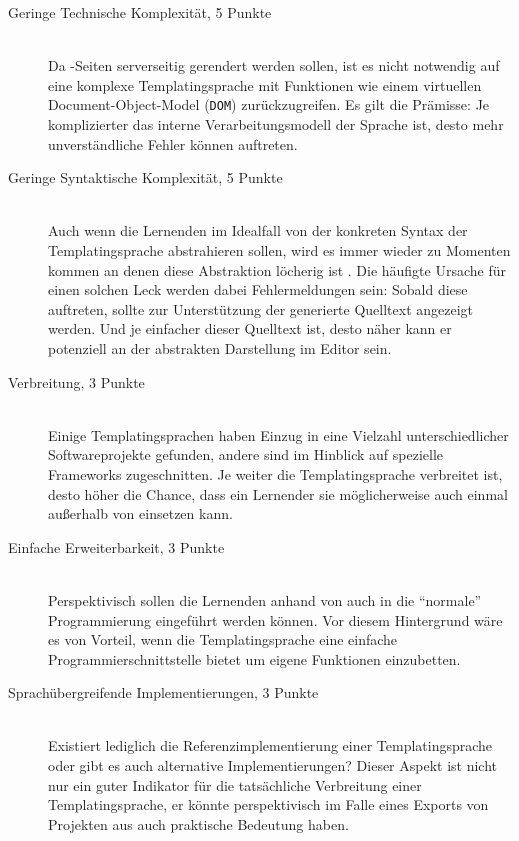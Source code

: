 \begin{description}
\item[Geringe Technische Komplexität, 5 Punkte] \hfill \\
  Da \idename-Seiten serverseitig gerendert werden sollen, ist es nicht notwendig auf eine komplexe Templatingsprache mit Funktionen wie einem virtuellen Document-Object-Model (\texttt{DOM}) zurückzugreifen. Es gilt die Prämisse: Je komplizierter das interne Verarbeitungsmodell der Sprache ist, desto mehr unverständliche Fehler können auftreten.
\item[Geringe Syntaktische Komplexität, 5 Punkte] \hfill \\
  Auch wenn die Lernenden im Idealfall von der konkreten Syntax der Templatingsprache abstrahieren sollen, wird es immer wieder zu Momenten kommen an denen diese Abstraktion löcherig ist \cite{spolsky_law_abstractions}. Die häufigte Ursache für einen solchen Leck werden dabei Fehlermeldungen sein: Sobald diese auftreten, sollte zur Unterstützung der generierte Quelltext angezeigt werden. Und je einfacher dieser Quelltext ist, desto näher kann er potenziell an der abstrakten Darstellung im Editor sein.
\item[Verbreitung, 3 Punkte] \hfill \\
  Einige Templatingsprachen haben Einzug in eine Vielzahl unterschiedlicher Softwareprojekte gefunden, andere sind im Hinblick auf spezielle Frameworks zugeschnitten. Je weiter die Templatingsprache verbreitet ist, desto höher die Chance, dass ein Lernender sie möglicherweise auch einmal außerhalb von \idename einsetzen kann.
\item[Einfache Erweiterbarkeit, 3 Punkte] \hfill \\
  Perspektivisch sollen die Lernenden anhand von \idename auch in die "`normale"' Programmierung eingeführt werden können. Vor diesem Hintergrund wäre es von Vorteil, wenn die Templatingsprache eine einfache Programmierschnittstelle bietet um eigene Funktionen einzubetten.  
\item[Sprachübergreifende Implementierungen, 3 Punkte] \hfill \\
  Existiert lediglich die Referenzimplementierung einer Templatingsprache oder gibt es auch alternative Implementierungen? Dieser Aspekt ist nicht nur ein guter Indikator für die tatsächliche Verbreitung einer Templatingsprache, er könnte perspektivisch im Falle eines Exports von Projekten aus \idename auch praktische Bedeutung haben.
\end{description}

